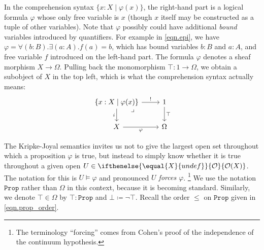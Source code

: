 \documentclass[reqno,11pt]{amsproc}
\theoremstyle{plain}
\theoremstyle{definition}
\newcommand{\Const}[1]{\mathtt{#1}}
\renewcommand{\to}[1][]{\xrightarrow{#1}}
\newcommand{\prop}{\Const{Prop}}
\newcommand{\Op}[1][undef]{\ifthenelse{\equal{#1}{undef}}{\mathcal{O}}{\mathcal{O}(#1)}}
\newcommand{\true}{\top}
\newcommand{\false}{\bot}
\numberwithin{equation}{section}
\begin{document}
In the comprehension syntax $\{x:X\mid\varphi(x)\}$, the right-hand part is a logical formula $\varphi$ whose only free variable is $x$ (though $x$ itself may be constructed as a tuple of other variables). Note that $\varphi$ possibly could have additional \emph{bound} variables introduced by quantifiers. For example in \eqref{eqn.epi}, we have $\varphi=\forall (b:B).\exists(a:A). f(a)=b$, which has bound variables $b:B$ and $a:A$, and free variable $f$ introduced on the left-hand part. The formula $\varphi$ denotes a sheaf morphism $X\to\Omega$. Pulling back the monomorphism $\top\colon 1\to\Omega$, we obtain a subobject of $X$ in the top left, which is what the comprehension syntax actually means:
\[
\begin{tikzcd}
	\{x:X\mid\varphi(x)\}\ar[r, "!"]\ar[d, "i"']&
	1\ar[d, "\top"]\\
	X\ar[r, "\varphi"']&
	\Omega\ar[ul, phantom, very near end, "\lrcorner"]
\end{tikzcd}
\]

The Kripke-Joyal semantics invites us not to give the largest open set throughout which a proposition $\varphi$ is true, but instead to simply know whether it is true throughout a given open $U\in\Op[X]$. The notation for this is $U\models\varphi$ and pronounced \emph{$U$ forces $\varphi$}.%
\footnote{The terminology ``forcing'' comes from Cohen's proof of the independence of the continuum hypothesis.}
We use the notation $\prop$ rather than $\Omega$ in this context, because it is becoming standard. Similarly, we denote $\top\in\Omega$ by $\true:\prop$ and $\false\coloneqq\neg\true$. Recall the order $\leq$ on $\prop$ given in \eqref{eqn.prop_order}.
\end{document}
